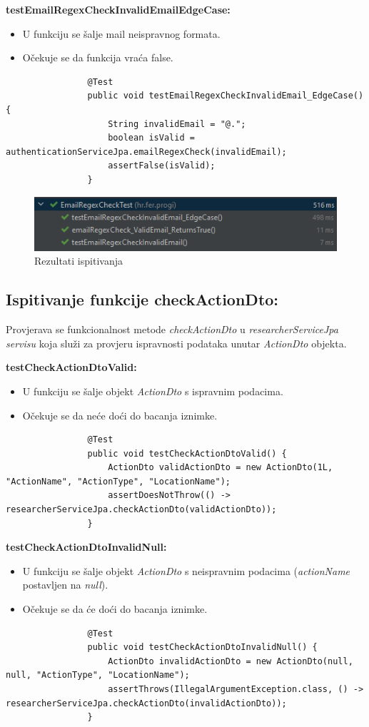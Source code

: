 			\textbf{testEmailRegexCheckInvalidEmailEdgeCase:}
			\begin{itemize}
				\item U funkciju se šalje mail neispravnog formata.
				\item Očekuje se da funkcija vraća false.
			\end{itemize}
			\begin{lstlisting}
				@Test
				public void testEmailRegexCheckInvalidEmail_EdgeCase() {
					String invalidEmail = "@.";
					boolean isValid = authenticationServiceJpa.emailRegexCheck(invalidEmail);
					assertFalse(isValid);
				}
			\end{lstlisting}
			\begin{figure}[H]
				\includegraphics[scale=1]{slike/emailRegexTest.png} 
				\centering
				\caption{Rezultati ispitivanja}
				\label{fig:promjene}
			\end{figure}
			
			
			\subsection{Ispitivanje funkcije checkActionDto:}
			Provjerava se funkcionalnost metode \textit{checkActionDto} u \textit{researcherServiceJpa servisu} koja služi za provjeru ispravnosti podataka unutar \textit{ActionDto} objekta.
			
			\textbf{testCheckActionDtoValid:}
			\begin{itemize}
				\item U funkciju se šalje objekt \textit{ActionDto} s ispravnim podacima.
				\item Očekuje se da neće doći do bacanja iznimke.
			\end{itemize}
			\begin{lstlisting}
				@Test
				public void testCheckActionDtoValid() {
					ActionDto validActionDto = new ActionDto(1L, "ActionName", "ActionType", "LocationName");
					assertDoesNotThrow(() -> researcherServiceJpa.checkActionDto(validActionDto));
				}
			\end{lstlisting}
			
			\textbf{testCheckActionDtoInvalidNull:}
			\begin{itemize}
				\item U funkciju se šalje objekt \textit{ActionDto} s neispravnim podacima (\textit{actionName} postavljen na \textit{null}).
				\item Očekuje se da će doći do bacanja iznimke.
			\end{itemize}
			\begin{lstlisting}
				@Test
				public void testCheckActionDtoInvalidNull() {
					ActionDto invalidActionDto = new ActionDto(null, null, "ActionType", "LocationName");
					assertThrows(IllegalArgumentException.class, () -> researcherServiceJpa.checkActionDto(invalidActionDto));
				}
			\end{lstlisting}
			
